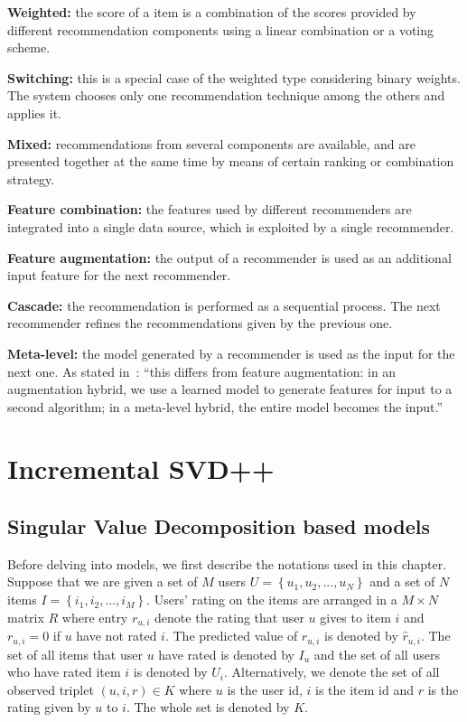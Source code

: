 \documentclass[oneside,13pt]{extreport}
\begin{document}
\begin{description}
    \item{\textbf{Weighted:}}  the score of a item is a combination of the scores provided by different recommendation components  using a linear combination or a voting scheme. 
    \item{\textbf{Switching:}} this is a special case of the weighted type considering binary weights. The system chooses only one recommendation technique among the others and applies it. 
    \item{\textbf{Mixed:}} recommendations from several components are available, and are presented together at the same time by means of certain ranking or combination strategy.
    \item{\textbf{Feature combination:}} the features used by different recommenders are integrated into a single data source, which is exploited by a single recommender.
    \item{\textbf{Feature augmentation:}} the output of a recommender is used as an additional input feature for the next recommender.
    \item{\textbf{Cascade:}} the recommendation is performed as a sequential process. The next recommender refines the recommendations given by the previous one. 
    \item{\textbf{Meta-level:}} the model generated by a recommender is used as the input for the next one. As stated in~\cite{Burke02}: “this differs from feature augmentation: in an augmentation hybrid, we use a learned model to generate features for input to a second algorithm; in a meta-level hybrid, the entire model becomes the input.”
\end{description}

\chapter{Incremental SVD++}
\label{ISVD++_chapter}

\section{Singular Value Decomposition based models}
Before delving into models, we first describe the notations used in this chapter. Suppose that we are given
a set of $M$ users $U = \left\{ {{u_1},{u_2},...,{u_N}} \right\}$ and a set of $N$ items $I = \left\{ {{i_1},{i_2},...,{i_M}} \right\}$. Users’ rating on the items are arranged in a $M \times N$ matrix $R$ where entry $r_{u,i}$ denote the rating that user $u$ gives to item $i$ and $r_{u,i} = 0$ if $u$ have not rated $i$. The predicted value of $r_{u,i}$ is denoted by $\hat r_{u,i}$. The set of all items that user $u$
have rated is denoted by $I_u$ and the set of all users who have rated item $i$ is denoted by $U_i$. Alternatively, we denote the set of all observed
triplet $\left( {u,i,r} \right) \in K$  where $u$ is the user id, $i$ is the item id
and $r$ is the rating given by $u$ to $i$. The whole set is denoted by $K$. 
\end{document}
